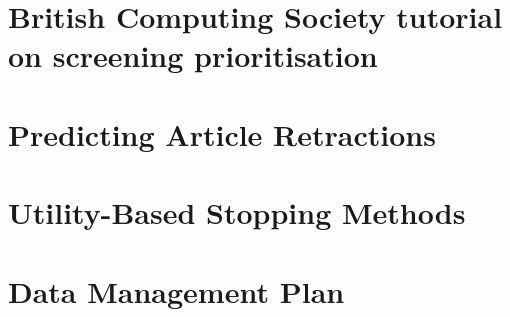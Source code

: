 \documentclass[10pt,oneside]{book}
\begin{document}
\printbibliography[title={References}]
\appendix* %

\chapter*{British Computing Society tutorial on screening prioritisation}

\label{app:Screening_Prioritisation}
\chapter*{Predicting Article Retractions}

\label{app:Predicting_article_retractions}
\chapter*{Utility-Based Stopping Methods}

\label{app:Utility_Based_Stopping_Methods}
\chapter*{Data Management Plan}

\label{app:dmp}
\end{document}
